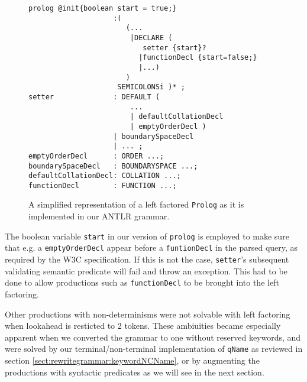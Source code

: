 \begin{figure}[h!]
\begin{verbatim}
prolog @init{boolean start = true;}
                    :(
                       (...
                        |DECLARE (
                           setter {start}?
                          |functionDecl {start=false;}
                          |...)
                       )
                     SEMICOLONSi )* ;
setter              : DEFAULT (
                        ...
                        | defaultCollationDecl
                        | emptyOrderDecl )
                    | boundarySpaceDecl
                    | ... ;
emptyOrderDecl      : ORDER ...;
boundarySpaceDecl   : BOUNDARYSPACE ...;
defaultCollationDecl: COLLATION ...;
functionDecl        : FUNCTION ...;
\end{verbatim}
\label{fig:antlrFactored}
\caption[\texttt{Prolog} left factored.]{A simplified representation of a left factored \texttt{Prolog} as it is implemented in our ANTLR grammar.}
\end{figure}

The boolean variable \verb!start! in our version of \verb!prolog! is employed to make sure that e.g. a \verb!emptyOrderDecl! appear before a \verb!funtionDecl! in the parsed query, as required by the W3C specification. If this is not the case, \verb!setter!'s subsequent validating semantic predicate will fail and throw an exception. This had to be done to allow productions such as \verb!functionDecl! to be brought into the left factoring.

Other productions with non-determinisms were not solvable with left factoring when lookahead is resticted to 2 tokens. These ambiuities became especially apparent when we converted the grammar to one without reserved keywords, and were solved by our terminal/non-terminal implementation of \verb!qName! as reviewed in section \ref{sect:rewritegrammar:keywordNCName}, or by augmenting the productions with syntactic predicates as we will see in the next section.
